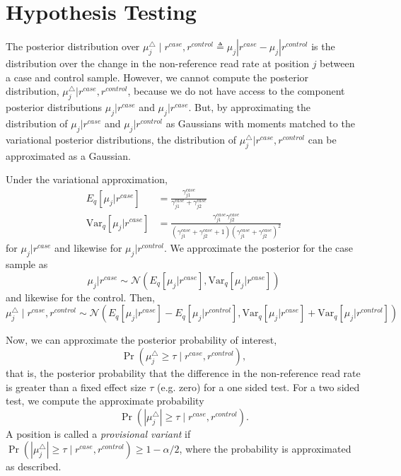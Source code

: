 \documentclass[11pt,reqno]{amsart}
\begin{document}
\section{Hypothesis Testing}
The posterior distribution over $\mu_j^{\triangle} \mid r^{case}, r^{control} \triangleq \mu_j|r^{case} - \mu_j|r^{control}$ is the distribution over the change in the non-reference read rate at position $j$ between a case and control sample.
However, we cannot compute the posterior distribution, $\mu_j^{\triangle} | r^{case}, r^{control}$, because we do not have access to the component posterior distributions $\mu_j|r^{case}$ and $\mu_j|r^{case}$.
But, by approximating the distribution of $\mu_j|r^{case}$ and $\mu_j|r^{control}$ as Gaussians with moments matched to the variational posterior distributions, the distribution of $\mu_j^{\triangle} | r^{case}, r^{control}$ can be approximated as a Gaussian.

Under the variational approximation,
\begin{align}
  E_q[\mu_j|r^{case}] &= \frac{\gamma_{j1}^{case}}{\gamma_{j1}^{case} + \gamma_{j2}^{case}}
  \\
  \text{Var}_q[\mu_j|r^{case}] &= \frac{\gamma_{j1}^{case} \gamma_{j2}^{case}}{(\gamma_{j1}^{case} + \gamma_{j2}^{case} + 1)(\gamma_{j1}^{case} + \gamma_{j2}^{case})^2}
\end{align}
for $\mu_j|r^{case}$ and likewise for $\mu_j|r^{control}$.
We approximate the posterior for the case sample as
\begin{equation}
  \mu_j | r^{case} \sim \mathcal{N}(E_q[\mu_j|r^{case}], \text{Var}_q[\mu_j|r^{case}])
\end{equation}
and likewise for the control.
Then,
\begin{equation}
  \mu_j^{\triangle} \mid r^{case}, r^{control} \sim \mathcal{N}(E_q[\mu_j|r^{case}] - E_q[\mu_j|r^{control}], \text{Var}_q[\mu_j|r^{case}] + \text{Var}_q[\mu_j|r^{control}])
\end{equation}

Now, we can approximate the posterior probability of interest,
\begin{equation}
  \Pr( \mu_j^{\triangle} \geq \tau \mid r^{case}, r^{control} ),
\end{equation}
that is, the posterior probability that the difference in the non-reference read rate is greater than a fixed effect size $\tau$ (e.g. zero) for a one sided test.
For a two sided test, we compute the approximate probability
\begin{equation}
  \Pr( | \mu_j^{\triangle} | \geq \tau \mid r^{case}, r^{control}).
\end{equation}
A position is called a \textit{provisional variant} if $\Pr( | \mu_j^{\triangle} | \geq \tau \mid r^{case}, r^{control}) \geq 1-\alpha/2$, where the probability is approximated as described.
\end{document}
